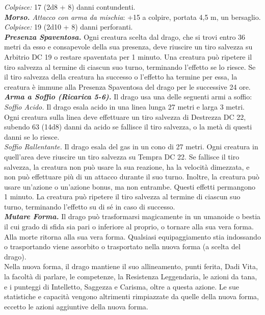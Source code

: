 \begin{multicols}{2}
\emph{Colpisce:} 17 (2d8 + 8) danni contundenti.\\
\emph{\textbf{Morso.} Attacco con arma da mischia}: +15 a colpire, portata 4,5 m, un bersaglio.\\
\emph{Colpisce:} 19 (2d10 + 8) danni perforanti.\\
\emph{\textbf{Presenza Spaventosa.}} Ogni creatura scelta dal drago, che si trovi entro 36 metri da esso e consapevole della sua presenza, deve riuscire un tiro salvezza su Arbitrio DC 19 o restare spaventata per 1 minuto. Una creatura può ripetere il tiro salvezza al termine di ciascun suo turno, terminando l'effetto se lo riesce. Se il tiro salvezza della creatura ha successo o l'effetto ha termine per essa, la creatura è immune alla Presenza Spaventosa del drago per le successive 24 ore.\\
\emph{\textbf{Arma a Soffio (Ricarica 5-6).}} Il drago usa una delle seguenti armi a soffio:\\
\emph{Soffio Acido.} Il drago esala acido in una linea lunga 27 metri e larga 3 metri. Ogni creatura sulla linea deve effettuare un tiro salvezza di Destrezza DC 22, subendo 63 (14d8) danni da acido se fallisce il tiro salvezza, o la metà di questi danni se lo riesce.\\
\emph{Soffio Rallentante.} Il drago esala del gas in un cono di 27 metri. Ogni creatura in quell'area deve riuscire un tiro salvezza su Tempra DC 22. Se fallisce il tiro salvezza, la creatura non può usare la sua reazione, ha la velocità dimezzata, e non può effettuare più di un attacco durante il suo turno. Inoltre, la creatura può usare un'azione o un'azione bonus, ma non entrambe. Questi effetti permangono 1 minuto. La creatura può ripetere il tiro salvezza al termine di ciascun suo turno, terminando l'effetto su di sé in caso di successo.\\
\emph{\textbf{Mutare Forma.}} Il drago può trasformarsi magicamente in un umanoide o bestia il cui grado di sfida sia pari o inferiore al proprio, o tornare alla sua vera forma. Alla morte ritorna alla sua vera forma. Qualsiasi equipaggiamento stia indossando o trasportando viene assorbito o trasportato nella nuova forma (a scelta del drago). \\
Nella nuova forma, il drago mantiene il suo allineamento, punti ferita, Dadi Vita, la facoltà di parlare, le competenze, la Resistenza Leggendaria, le azioni da tana, e i punteggi di Intelletto, Saggezza e Carisma, oltre a questa azione. Le sue statistiche e capacità  vengono altrimenti rimpiazzate da quelle della nuova forma, eccetto le azioni aggiuntive della nuova forma.

\end{multicols}
